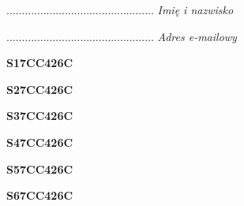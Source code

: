 \begin{turn}{90}\begin{minipage}{\linewidth} \vspace{20mm} ................................................  \textit{Imię i nazwisko}\end{minipage}\end{turn}

\begin{turn}{90}\begin{minipage}{\linewidth} \vspace{20mm} ................................................  \textit{Adres e-mailowy}\end{minipage}\end{turn}

\begin{turn}{90}\huge \begin{minipage}{\linewidth} \vspace{10mm}\textbf{S17CC426C}\end{minipage}\end{turn}

\begin{turn}{90}\huge \begin{minipage}{\linewidth} \vspace{10mm}\textbf{S27CC426C}\end{minipage}\end{turn}

\begin{turn}{90}\huge \begin{minipage}{\linewidth} \vspace{10mm}\textbf{S37CC426C}\end{minipage}\end{turn}

\begin{turn}{90}\huge \begin{minipage}{\linewidth} \vspace{10mm}\textbf{S47CC426C}\end{minipage}\end{turn}

\begin{turn}{90}\huge \begin{minipage}{\linewidth} \vspace{10mm}\textbf{S57CC426C}\end{minipage}\end{turn}

\begin{turn}{90}\huge \begin{minipage}{\linewidth} \vspace{10mm}\textbf{S67CC426C}\end{minipage}\end{turn}

